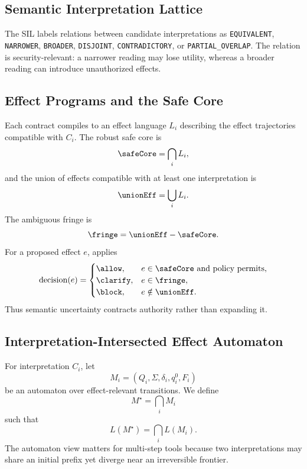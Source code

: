 \subsection{Semantic Interpretation Lattice}
The SIL labels relations between candidate interpretations as \texttt{EQUIVALENT}, \texttt{NARROWER}, \texttt{BROADER}, \texttt{DISJOINT}, \texttt{CONTRADICTORY}, or \texttt{PARTIAL\_OVERLAP}. The relation is security-relevant: a narrower reading may lose utility, whereas a broader reading can introduce unauthorized effects.

\subsection{Effect Programs and the Safe Core}
Each contract compiles to an effect language $L_i$ describing the effect trajectories compatible with $C_i$. The robust safe core is
\begin{equation}
  \safeCore = \bigcap_i L_i,
  \label{eq:safecore}
\end{equation}
and the union of effects compatible with at least one interpretation is
\begin{equation}
  \unionEff = \bigcup_i L_i.
\end{equation}
The ambiguous fringe is
\begin{equation}
  \fringe = \unionEff - \safeCore.
\end{equation}
For a proposed effect $e$, \system applies
\begin{equation}
\operatorname{decision}(e)=
\begin{cases}
\allow, & e\in\safeCore\text{ and policy permits},\\
\clarify, & e\in\fringe,\\
\block, & e\notin\unionEff.
\end{cases}
\end{equation}
Thus semantic uncertainty contracts authority rather than expanding it.

\subsection{Interpretation-Intersected Effect Automaton}
For interpretation $C_i$, let
\[
M_i=(Q_i,\Sigma,\delta_i,q_i^0,F_i)
\]
be an automaton over effect-relevant transitions. We define
\begin{equation}
M^\star=\bigcap_i M_i
\end{equation}
such that
\begin{equation}
L(M^\star)=\bigcap_i L(M_i).
\end{equation}
The automaton view matters for multi-step tools because two interpretations may share an initial prefix yet diverge near an irreversible frontier.

